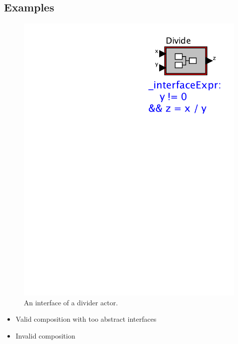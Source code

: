\documentclass[preprint,11pt,authoryear]{sigplanconf}
\begin{document}
\subsection{Examples}
\begin{figure}[htbp]
\centering
\includegraphics[width=\columnwidth]{figs/Divide2} 
\caption{An interface of a divider actor.}
\label{fig:divider}
\end{figure}

\begin{itemize}
	\item Valid composition with too abstract interfaces
	\item Invalid composition
\end{itemize}
\end{document}
